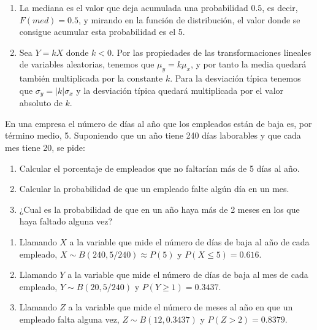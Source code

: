 {\begin{enumerate}
\item La mediana es el valor que deja acumulada una probabilidad $0.5$, es decir, $F(med)=0.5$, y mirando en la función de distribución, el
valor donde se consigue acumular esta probabilidad es el 5.

\item Sea $Y=kX$ donde $k<0$. Por las propiedades de las transformaciones lineales de variables aleatorias, tenemos que $\mu_y=k\mu_x$, y
por tanto la media quedará también multiplicada por la constante $k$. Para la desviación típica tenemos que $\sigma_y=|k|\sigma_x$ y la
desviación típica quedará multiplicada por el valor absoluto de $k$.
\end{enumerate}
}


{En una empresa el número de días al año que los empleados están de baja es, por término medio, 5. Suponiendo que un año tiene 240 días
laborables y que cada mes tiene 20, se pide:
\begin{enumerate}
\item Calcular el porcentaje de empleados que no faltarían más de 5 días al año.
\item Calcular la probabilidad de que un empleado falte algún día en un mes.
\item ¿Cual es la probabilidad de que en un año haya más de 2 meses en los que haya faltado alguna vez?
\end{enumerate}
} 
{
\begin{enumerate}
\item Llamando $X$ a la variable que mide el número de días de baja al año de cada empleado, $X\sim B(240,5/240)\approx P(5)$ y
$P(X\leq 5)=0.616$.
\item Llamando $Y$ a la variable que mide el número de días de baja al mes de cada empleado, $Y\sim B(20,5/240)$ y $P(Y\geq 1)=0.3437$.
\item Llamando $Z$ a la variable que mide el número de meses al año en que un empleado falta alguna vez, $Z\sim B(12,0.3437)$ y
$P(Z>2)=0.8379$.
\end{enumerate}
}
